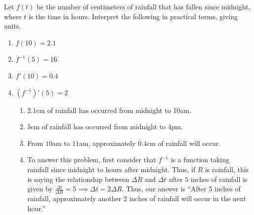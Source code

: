 \documentclass[11pt]{exam}
\begin{document}
\begin{questions}
\begin{solution}
\begin{enumerate}
  \end{enumerate}
\end{solution}
\question  Let $f(t)$ be the number of centimeters of rainfall that has
fallen since midnight, where $t$ is the time in hours. Interpret
the following in practical terms, giving units.

\begin{enumerate}
\item $f(10)=2.1$

\vfill
\item $f^{-1}(5)=16$

\vfill
\item $f'(10)=0.4$

\vfill
\item $(f^{-1})'(5)=2$

  \begin{solution}
    \begin{enumerate}
    \item \(2.1\)cm of rainfall has occurred from midnight to 10am.
    \item \(5\)cm of rainfall has occurred from midnight to 4pm.
    \item From \(10\)am to \(11\)am, approximately \(0.4\)cm of
      rainfall will occur.
    \item To answer this problem, first consider that \(f^{-1}\) is a
      function taking rainfall since midnight to hours after
      midnight. Thus, if \(R\) is rainfall, this is saying the relationship between \(\Delta
      R\) and \(\Delta t\) after \(5\) inches of rainfall is given by \(\frac{\Delta t}{\Delta R} = 5 \implies
      \Delta t = 2 \Delta R\). Thus, our answer is ``After 5 inches of
      rainfall, approximately another 2 inches of rainfall will occur
      in the next hour.''
    \end{enumerate}
  \end{solution}


\end{enumerate}
\end{questions}
\end{document}
